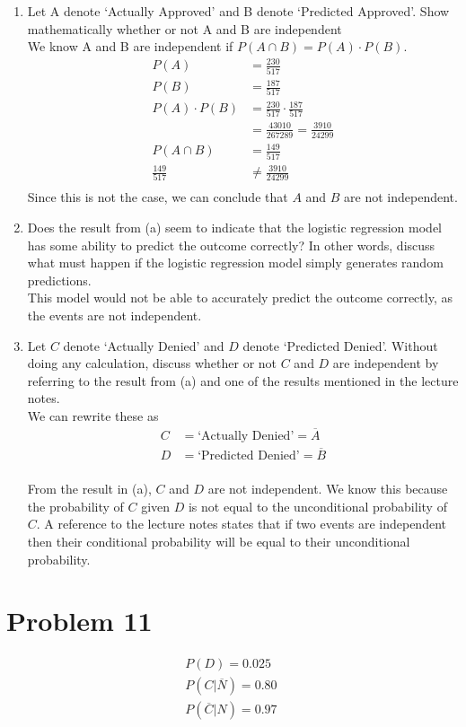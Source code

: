 \documentclass{article}
\begin{document}
\begin{enumerate}[label=\alph*)]
    \item Let A denote ‘Actually Approved’ and B denote ‘Predicted Approved’. Show
          mathematically whether or not A and B are independent \\
          We know A and B are independent if \(P(A \cap B) = P(A) \cdot P(B)\).
          \begin{align*}
              P(A)            & = \frac{230}{517}                           \\
              P(B)            & = \frac{187}{517}                           \\
              P(A) \cdot P(B) & = \frac{230}{517} \cdot \frac{187}{517}     \\
                              & = \frac{43010}{267289} = \frac{3910}{24299} \\
              P(A \cap B)     & = \frac{149}{517}                           \\
              \frac{149}{517} & \neq \frac{3910}{24299}                     \\
          \end{align*}
          Since this is not the case, we can conclude that \(A\) and \(B\) are not independent.
    \item Does the result from (a) seem to indicate that the logistic regression model has some
          ability to predict the outcome correctly? In other words, discuss what must happen if the
          logistic regression model simply generates random predictions. \\
          This model would not be able to accurately predict the outcome correctly, as the events are not independent.
    \item Let \(C\) denote ‘Actually Denied’ and \(D\) denote ‘Predicted Denied’. Without doing any
          calculation, discuss whether or not \(C\) and \(D\) are independent by referring to the result from (a)
          and one of the results mentioned in the lecture notes. \\
          We can rewrite these as
          \begin{align*}
              C & = \text{`Actually Denied'} = \overline{A}  \\
              D & = \text{`Predicted Denied'} = \overline{B} \\
          \end{align*}

          From the result in (a), \(C\) and \(D\) are not independent. We know this because the probability of \(C\) given \(D\) is not equal to the unconditional probability of \(C\). A reference to the lecture notes states that if two events are independent then their conditional probability will be equal to their unconditional probability.
\end{enumerate}

\pagebreak

\section*{Problem 11}
\begin{align*}
    P(D) = 0.025                    \\
    P(C \vert\overline{N}) = 0.80   \\
    P(\overline{C} \vert N) = 0.97\ \\
\end{align*}
\end{document}
